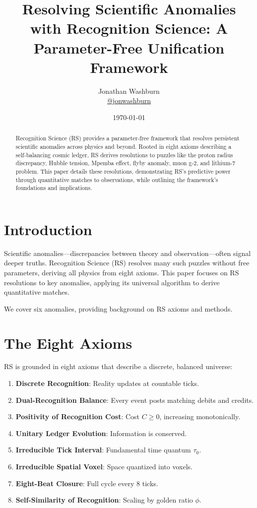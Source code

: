 \documentclass[11pt]{article}
\title{Resolving Scientific Anomalies with Recognition Science: A Parameter-Free Unification Framework}
\author{Jonathan Washburn \\ \href{https://x.com/jonwashburn}{@jonwashburn}}
\date{\today}
\begin{document}
\maketitle

\begin{abstract}
Recognition Science (RS) provides a parameter-free framework that resolves persistent scientific anomalies across physics and beyond. Rooted in eight axioms describing a self-balancing cosmic ledger, RS derives resolutions to puzzles like the proton radius discrepancy, Hubble tension, Mpemba effect, flyby anomaly, muon g-2, and lithium-7 problem. This paper details these resolutions, demonstrating RS's predictive power through quantitative matches to observations, while outlining the framework's foundations and implications.
\end{abstract}


\section{Introduction}

Scientific anomalies—discrepancies between theory and observation—often signal deeper truths. Recognition Science (RS) resolves many such puzzles without free parameters, deriving all physics from eight axioms. This paper focuses on RS resolutions to key anomalies, applying its universal algorithm to derive quantitative matches.

We cover six anomalies, providing background on RS axioms and methods.

\section{The Eight Axioms}

RS is grounded in eight axioms that describe a discrete, balanced universe:

\begin{enumerate}
    \item \textbf{Discrete Recognition}: Reality updates at countable ticks.
    \item \textbf{Dual-Recognition Balance}: Every event posts matching debits and credits.
    \item \textbf{Positivity of Recognition Cost}: Cost $C \geq 0$, increasing monotonically.
    \item \textbf{Unitary Ledger Evolution}: Information is conserved.
    \item \textbf{Irreducible Tick Interval}: Fundamental time quantum $\tau_0$.
    \item \textbf{Irreducible Spatial Voxel}: Space quantized into voxels.
    \item \textbf{Eight-Beat Closure}: Full cycle every 8 ticks.
    \item \textbf{Self-Similarity of Recognition}: Scaling by golden ratio $\phi$.
\end{enumerate}
\end{document}
